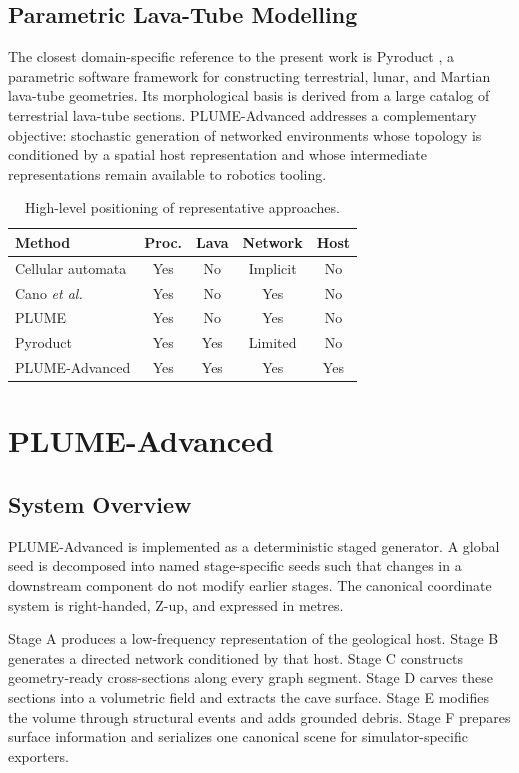 \documentclass[conference]{IEEEtran}
\begin{document}
\subsection{Parametric Lava-Tube Modelling}

The closest domain-specific reference to the present work is Pyroduct \cite{pyroduct2026}, a parametric software framework for constructing terrestrial, lunar, and Martian lava-tube geometries. Its morphological basis is derived from a large catalog of terrestrial lava-tube sections. PLUME-Advanced addresses a complementary objective: stochastic generation of networked environments whose topology is conditioned by a spatial host representation and whose intermediate representations remain available to robotics tooling.

\begin{table}[t]
\caption{High-level positioning of representative approaches.}
\label{tab:related}
\centering
\small
\begin{tabular}{@{}lcccc@{}}
\toprule
Method & Proc. & Lava & Network & Host
\tabularnewline
\midrule
Cellular automata \cite{johnson2010} & Yes & No & Implicit & No
\tabularnewline
Cano \emph{et al.} \cite{cano_gazebo} & Yes & No & Yes & No
\tabularnewline
PLUME \cite{plume2025} & Yes & No & Yes & No
\tabularnewline
Pyroduct \cite{pyroduct2026} & Yes & Yes & Limited & No
\tabularnewline
PLUME-Advanced & Yes & Yes & Yes & Yes
\tabularnewline
\bottomrule
\end{tabular}
\end{table}

\section{PLUME-Advanced}

\subsection{System Overview}

PLUME-Advanced is implemented as a deterministic staged generator. A global seed is decomposed into named stage-specific seeds such that changes in a downstream component do not modify earlier stages. The canonical coordinate system is right-handed, Z-up, and expressed in metres.

Stage A produces a low-frequency representation of the geological host. Stage B generates a directed network conditioned by that host. Stage C constructs geometry-ready cross-sections along every graph segment. Stage D carves these sections into a volumetric field and extracts the cave surface. Stage E modifies the volume through structural events and adds grounded debris. Stage F prepares surface information and serializes one canonical scene for simulator-specific exporters.
\end{document}
